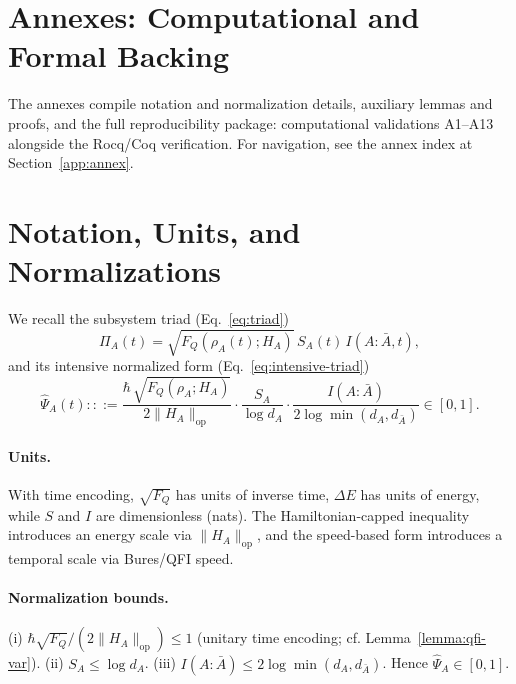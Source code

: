 \documentclass[10pt]{article}
\begin{document}
\appendix
\section*{Annexes: Computational and Formal Backing}
The annexes compile notation and normalization details, auxiliary lemmas and proofs, and the full
reproducibility package: computational validations A1--A13 alongside the Rocq/Coq verification.
For navigation, see the annex index at Section~\ref{app:annex}.



\theoremstyle{plain}
\newtheorem*{theorem*}{Theorem}

\section{Notation, Units, and Normalizations}

We recall the subsystem triad (Eq.~\eqref{eq:triad})
\[
\Pi_A(t) = \sqrt{F_Q(\rho_A(t);H_A)}\, S_A(t)\, I(A{:}\bar{A},t),
\]
and its intensive normalized form (Eq.~\eqref{eq:intensive-triad})
\[
\widehat{\Psi}_A(t)
:::= \frac{\hbar\,\sqrt{F_Q(\rho_A;H_A)}}{2\lVert H_A\rVert_{\mathrm{op}}}
\cdot \frac{S_A}{\log d_A}
\cdot \frac{I(A{:}\bar{A})}{2\log\min(d_A,d_{\bar{A}})}\in[0,1].
\]

\paragraph{Units.}
With time encoding, \(\sqrt{F_Q}\) has units of inverse time, \(\Delta E\) has units of energy, while \(S\) and \(I\) are dimensionless (nats).
The Hamiltonian-capped inequality introduces an energy scale via \(\lVert H_A\rVert_{\mathrm{op}}\), and the speed-based form introduces a temporal scale via Bures/QFI speed.

\paragraph{Normalization bounds.}
(i) \(\hbar\sqrt{F_Q}/(2\lVert H_A\rVert_{\mathrm{op}})\le 1\) (unitary time encoding; cf. Lemma~\ref{lemma:qfi-var}).
(ii) \(S_A\le \log d_A\).
(iii) \(I(A{:}\bar{A})\le 2\log\min(d_A,d_{\bar{A}})\).
Hence \(\widehat{\Psi}_A\in[0,1]\).
\end{document}
